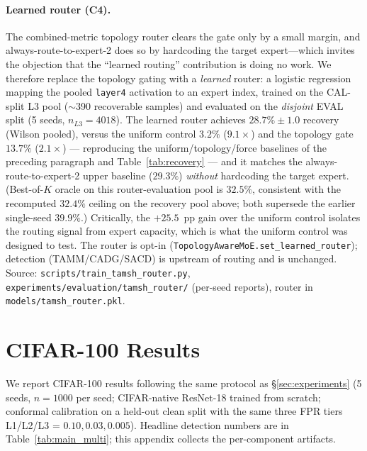\paragraph{Learned router (C4).}
The combined-metric topology router clears the gate only by a small margin,
and always-route-to-expert-2 does so by hardcoding the target expert---which
invites the objection that the ``learned routing'' contribution is doing no
work. We therefore replace the topology gating with a \emph{learned} router: a
logistic regression mapping the pooled \texttt{layer4} activation to an expert
index, trained on the CAL-split L3 pool ($\sim$390 recoverable samples) and
evaluated on the \emph{disjoint} EVAL split (5 seeds, $n_{L3}{=}4018$). The
learned router achieves $\mathbf{28.7\% \pm 1.0}$ recovery (Wilson pooled),
versus the uniform control $3.2\%$ ($9.1\times$) and the topology gate
$13.7\%$ ($2.1\times$) --- reproducing the uniform/topology/force baselines
of the preceding paragraph and Table~\ref{tab:recovery} --- and it matches the
always-route-to-expert-2 upper baseline ($29.3\%$) \emph{without} hardcoding
the target expert. (Best-of-$K$ oracle on this router-evaluation pool is
$32.5\%$, consistent with the recomputed $32.4\%$ ceiling on the recovery
pool above; both supersede the earlier single-seed $39.9\%$.) Critically, the $+25.5$~pp
gain over the uniform control isolates the routing signal from expert
capacity, which is what the uniform control was designed to test. The router is opt-in
(\texttt{TopologyAwareMoE.set\_learned\_router}); detection (TAMM/CADG/SACD)
is upstream of routing and is unchanged. Source:
\texttt{scripts/train\_tamsh\_router.py},
\texttt{experiments/evaluation/tamsh\_router/} (per-seed reports), router in
\texttt{models/tamsh\_router.pkl}.


\section{CIFAR-100 Results}
\label{app:cifar100}

We report CIFAR-100 results following the same protocol as
\S\ref{sec:experiments} (5 seeds, $n=1000$ per seed; CIFAR-native ResNet-18
trained from scratch; conformal calibration on a held-out clean split with
the same three FPR tiers L1/L2/L3 = $0.10, 0.03, 0.005$).
Headline detection numbers are in Table~\ref{tab:main_multi}; this
appendix collects the per-component artifacts.

